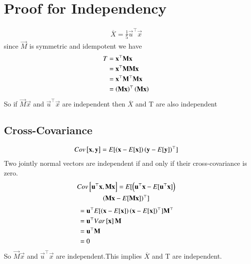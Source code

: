 \documentclass[journal,12pt,twocolumn]{IEEEtran}
\begin{document}
\section{Proof for Independency}
\begin{align}
    \overline{X}=\frac{1}{5}\vec{u}^{\top}\vec{x}
\end{align}
since $\vec{M}$ is symmetric and idempotent we have
\begin{align}
   T&=\mathbf{x}^{\top}\mathbf{M}\mathbf{x}\\
    &=\mathbf{x}^{\top}\mathbf{M}\mathbf{M}\mathbf{x}\\
    &=\mathbf{x}^{\top}\mathbf{M}^{\top}\mathbf{M}\mathbf{x}\\
    &=\left(\mathbf{M}\mathbf{x}\right)^{\top}\left(\mathbf{M}\mathbf{x}\right) 
\end{align}
So if $\vec{M}\vec{x}$ and $\vec{u}^{\top}\vec{x}$ are independent then $\overline{X}$ and T are also independent
\subsection{Cross-Covariance}
\begin{align}
    Cov{}\left[\mathbf{x},\mathbf{y}\right]=E[ \left(\mathbf{x}-E[ \mathbf{x} ]\right)\left(\mathbf{y}-E[ \mathbf{y} ]\right)^{\top} ]
\end{align}
Two jointly normal vectors are independent if and only if their cross-covariance is zero.
\begin{multline}
    Cov{}\left[\mathbf{u}^{\top}\mathbf{x},\mathbf{M}\mathbf{x}\right]=E[ \left(\mathbf{u}^{\top}\mathbf{x}-E[ \mathbf{u}^{\top}\mathbf{x} ]\right)\\\left(\mathbf{M}\mathbf{x}-E[ \mathbf{M}\mathbf{x} ]\right)^{\top} ]
\end{multline}
\begin{align}
    &=\mathbf{u}^{\top}E[ \left(\mathbf{x}-E[ \mathbf{x} ]\right)\left(\mathbf{x}-E[ \mathbf{x} ]\right)^{\top} ]\mathbf{M}^{\top}\\
    &=\mathbf{u}^{\top}Var{}\left[\mathbf{x}\right]\mathbf{M}\\
    &=\mathbf{u}^{\top}\mathbf{M}\\
    &=0
\end{align}
So $\vec{M}\vec{x}$ and $\vec{u}^{\top}\vec{x}$ are independent.This implies $\overline{X}$ and T are independent.
\end{document}
